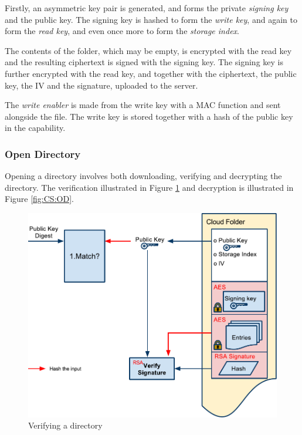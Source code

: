 \documentclass[pdftex,english,10pt,b5paper,twoside]{book}
\begin{document}
Firstly, an asymmetric key pair is generated, and forms the private
\emph{signing key} and the public key. The signing key is hashed to form the
\emph{write key}, and again to form the \emph{read key}, and even once more to
form the \emph{storage index}.

The contents of the folder, which may be empty, is encrypted with the read key
and the resulting ciphertext is signed with the signing key. The signing key is
further encrypted with the read key, and together with the ciphertext, the
public key, the \ac{IV} and the signature, uploaded to the server.

The \emph{write enabler} is made from the write key with a \ac{MAC} function
and sent alongside the file. The write key is stored together with a hash of
the public key in the capability.

\subsubsection{Open Directory}

Opening a directory involves both downloading, verifying and decrypting the
directory. The verification illustrated in Figure \ref{fig:CS:VOD} and
decryption is illustrated in Figure \ref{fig:CS:OD}.

\begin{figure}[h!]
    \centering
    \includegraphics[width=\columnwidth]{CryptoVerifyOpenFolder.pdf}
    \caption{Verifying a directory}
    \label{fig:CS:VOD}
\end{figure}
\end{document}
